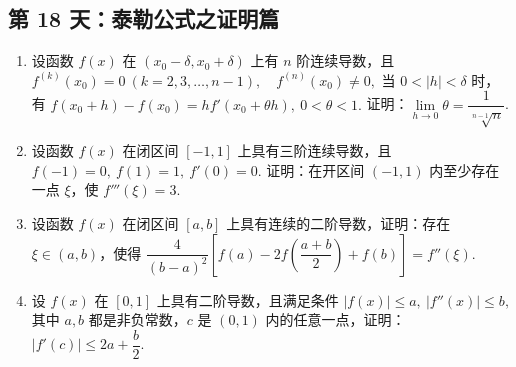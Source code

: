 \subsection*{第 18 天：泰勒公式之证明篇}
\vspace{1cm}

\begin{enumerate}[label=\textbf{\arabic*.}, itemsep=6cm]
    \item 设函数 $f(x)$ 在 $(x_0-\delta,x_0+\delta)$ 上有 $n$ 阶连续导数，且
    $ f^{(k)}(x_0)=0\ (k=2,3,\dots,n-1),\quad f^{(n)}(x_0)\ne 0, $
    当 $0<|h|<\delta$ 时，有
    $ f(x_0+h)-f(x_0)=hf'(x_0+\theta h),\ 0<\theta<1. $
    证明：$\lim\limits_{h\to 0}\theta=\dfrac{1}{\sqrt[n-1]{n}}$.
    
    \item 设函数 $f(x)$ 在闭区间 $[-1,1]$ 上具有三阶连续导数，且
    $ f(-1)=0,\ f(1)=1,\ f'(0)=0. $
    证明：在开区间 $(-1,1)$ 内至少存在一点 $\xi$，使 $f'''(\xi)=3$.
    
    \item 设函数 $f(x)$ 在闭区间 $[a,b]$ 上具有连续的二阶导数，证明：存在 $\xi\in(a,b)$，使得
    $ \dfrac{4}{(b-a)^2}\left[f(a)-2f\left(\dfrac{a+b}{2}\right)+f(b)\right]=f''(\xi). $
    
    \item 设 $f(x)$ 在 $[0,1]$ 上具有二阶导数，且满足条件
    $ |f(x)|\le a,\ |f''(x)|\le b, $
    其中 $a,b$ 都是非负常数，$c$ 是 $(0,1)$ 内的任意一点，证明：
    $ |f'(c)|\le 2a+\dfrac{b}{2}. $
\end{enumerate}

\newpage

